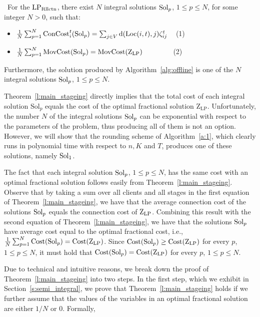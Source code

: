 \begin{theorem}~\label{l:main_stageing}For the $\mathrm{LP_{\mathrm{Rllctn}}}$, there exist $N$ integral solutions $\mathrm{Sol}_p$, $1\leq p \leq N$, for some integer $N>0$, such that:
\begin{itemize}
    \item $\frac{1}{N}\sum_{p=1}^N\mathrm{ConCost}_i^t(\mathrm{Sol}_p)=\sum_{j\in V} 
    \mathrm{d}(\mathrm{Loc}(i,t),j)\zeta_{ij}^t$ \,\,\, (1)
    \item $\frac{1}{N}\sum_{p=1}^N\mathrm{MovCost}(\mathrm{Sol}_p)=\mathrm{MovCost}(\mathrm{Z}_{\mathrm{LP}})$ \,\,\,\,\,\, \,\,\, \,\,\,\,\,\,\,\,\,  (2)
\end{itemize}
Furthermore, the solution produced by Algorithm~\ref{alg:offline} is one of the $N$ integral solutions $\mathrm{Sol}_p$, $1\leq p \leq N$.
\end{theorem}


Theorem~\ref{l:main_stageing} directly implies that the total cost of each integral solution $\mathrm{Sol}_p$ equals the cost of the optimal fractional solution $\mathrm{Z_{LP}}$. Unfortunately, the number $N$ of the integral solutions $\mathrm{Sol}_p$ can be exponential with respect to the parameters of the problem, thus producing all of them is not an option.
However, we will show that the rounding scheme of Algorithm~\ref{a:1}, 
which clearly runs in polynomial time with respect to $n, K$ and $T$, produces one of these solutions, namely $\mathrm{Sol}_1$. 


The fact that each integral solution $\mathrm{Sol}_p$, $1 \leq p \leq N$, has the same cost with an optimal fractional solution follows easily from Theorem~\ref{l:main_stageing}.
Observe that by taking a sum over all clients and all stages in the first equation of Theorem~\ref{l:main_stageing}, we have that the average connection cost of the solutions $\mathrm{Sol}_p$ equals the connection cost of $\mathrm{Z}_{\mathrm{LP}}$. Combining this result with the second equation of Theorem~\ref{l:main_stageing}, we have that the solutions $\mathrm{Sol}_p$ have average cost equal to the optimal fractional cost, i.e., $\frac{1}{N} \sum_{p=1}^{N}\mathrm{Cost}(\mathrm{Sol}_p)= \mathrm{Cost}(\mathrm{Z}_{\mathrm{LP}})$. Since $\mathrm{Cost}(\mathrm{Sol}_p) \geq  \mathrm{Cost}(\mathrm{Z}_{\mathrm{LP}})$ for every $p$, $1\leq p \leq N$, it must hold that $\mathrm{Cost}(\mathrm{Sol}_p)= \mathrm{Cost}(\mathrm{Z}_{\mathrm{LP}})$ for every $p$, $1\leq p \leq N$. 


Due to technical and intuitive reasons, we break down the proof of Theorem~\ref{l:main_stageing} into two steps. In the first step, which we exhibit in Section~\ref{s:semi_integral}, we prove that Theorem~\ref{l:main_stageing} holds if we further assume that the values of the variables in an optimal fractional solution are either $1/N$ or $0$. Formally,

